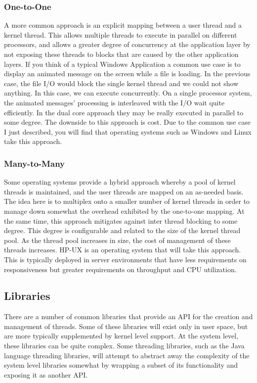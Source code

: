 \documentclass[10pt,a4paper]{article}
\begin{document}
\subsubsection{One-to-One}
A more common approach is an explicit mapping between a user thread and a kernel thread. This allows multiple threads to execute in parallel on different processors, and allows a greater degree of concurrency at the application layer by not exposing these threads to blocks that are caused by the other application layers. If you think of a typical Windows Application a common use case is to display an animated message on the screen while a file is loading. In the previous case, the file I/O would block the single kernel thread and we could not show anything. In this case, we can execute concurrently. On a single processor system, the animated messages' processing is interleaved with the I/O wait quite efficiently. In the dual core approach they may be really executed in parallel to some degree. The downside to this approach is cost. Due to the common use case I just described, you will find that operating systems such as Windows and Linux take this approach. 
\subsubsection{Many-to-Many}
Some operating systems provide a hybrid approach whereby a pool of kernel threads is maintained, and the user threads are mapped on an as-needed basis. The idea here is to multiplex onto a smaller number of kernel threads in order to manage down somewhat the overhead exhibited by the one-to-one mapping. At the same time, this approach mitigates against inter thread blocking to some degree. This degree is configurable and related to the size of the kernel thread pool. As the thread pool increases in size, the cost of management of these threads increases. HP-UX is an operating system that will take this approach. This is typically deployed in server environments that have less requirements on responsiveness but greater requirements on throughput and CPU utilization. 
\subsection{Libraries}
There are a number of common libraries that provide an API for the creation and management of threads. Some of these libraries will exist only in user space, but are more typically supplemented by kernel level support. At the system level, these libraries can be quite complex. Some threading libraries, such as the Java language threading libraries, will attempt to abstract away the complexity of the system level libraries somewhat by wrapping a subset of its functionality and exposing it as another API. 
\end{document}
